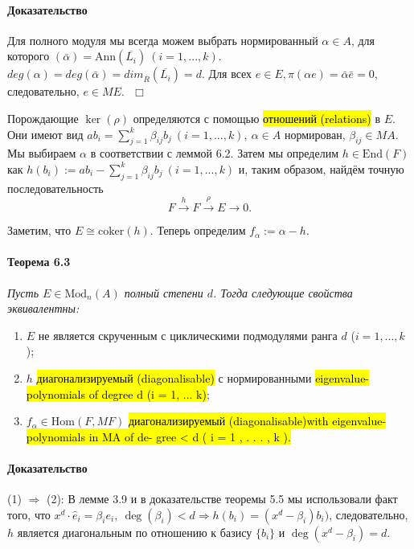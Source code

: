 \documentclass[a4paper,12pt]{article}
\newcommand{\hatei}[1]{\hat{e}_{#1}}
\newcommand{\Ann}{\text{Ann}}
\newcommand{\Endom}{\text{End}}
\newcommand{\coker}{\text{coker}}
\newcommand{\Hom}{\text{Hom}}
\newcommand{\Mod}{\text{Mod}}
\begin{document}
\paragraph{Доказательство}
Для полного модуля мы всегда можем выбрать нормированный $\alpha \in A$, для которого $(\bar{\alpha}) = \Ann (\overline{L_i}) ~ (i = 1,...,k)$. $deg(\alpha) = deg(\bar{\alpha}) = dim_{\overline{R}}(\overline{L_i}) = d$. Для всех $e \in E, \pi(\alpha e) = \bar{\alpha} \bar{e} = 0$, следовательно, $e \in M E. ~~~ \Box$

Порождающие $\ker(\rho)$ определяются с помощью \hl{отношений (relations)} в $E$. Они имеют вид $a b_i = \sum_{j = 1}^{k} \beta_{ij} b_j ~ (i = 1, ..., k), ~ \alpha \in A$ нормирован, $\beta_{ij} \in M A$. Мы выбираем $\alpha$ в соответствии с леммой 6.2. Затем мы определим $h \in \Endom(F)$ как $h(b_i) := a b_i - \sum_{j=1}^{k} \beta_{ij} b_j ~ (i = 1, ..., k)$ и, таким образом, найдём точную последовательность
$$
F \overset{h}{\rightarrow} F \overset{\rho}{\rightarrow} E \rightarrow 0.
$$

Заметим, что $E \cong \coker(h)$. Теперь определим $f_\alpha := \alpha - h$.


\paragraph{Теорема 6.3}
{\itshape Пусть $E \in \Mod_n(A)$ полный степени $d$. Тогда следующие свойства эквивалентны:
	\begin{enumerate}
		\item $E$ не является скрученным с циклическими подмодулями ранга $d$ ($i = 1, ..., k$);
		\item $h$ \hl{диагонализируемый (diagonalisable)} с нормированными \hl{eigenvalue-polynomials of degree d (i = 1, ... k)}; %
		\item $f_{\alpha} \in \Hom(F, MF)$ \hl{диагонализируемый (diagonalisable)}\hl{with eigenvalue-polynomials in MA of de-
		gree < d ( i = 1 , . . . , k ).}
	\end{enumerate}

}


\paragraph{Доказательство}
(1) $\Rightarrow$ (2): В лемме 3.9 и в доказательстве теоремы 5.5 мы использовали факт того, что $x^d \cdot \hatei{i} = \beta_i e_i, ~ \deg(\beta_i) < d \Rightarrow h(b_i) = (x^d - \beta_i) b_i)$, следовательно, $h$ является диагональным по отношению к базису $\{b_i\}$ и $\deg(x^d - \beta_i) = d$.
\end{document}
